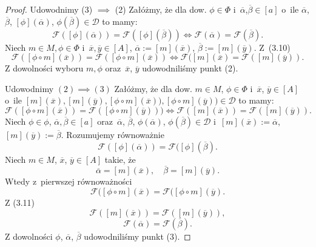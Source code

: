 \documentclass[12pt,a4paper]{report}
\newcommand{\domkniecie}[1]{\left[ {#1} \right] }
\begin{document}
\begin{proof}
Udowodnimy (3) $\implies$ (2)
Załóżmy, że dla dow. $\phi \in \Phi$ i~$\overline{\alpha}$,$ \overline{\beta} \in \domkniecie{a}$ o~ile $\overline{\alpha}$, $\overline{\beta}$, $\domkniecie{\phi}(\overline{\alpha})$, $\phi(\overline{\beta}) \in \mathcal{D}$ to mamy:
\begin{equation}
\mathcal{F}(\domkniecie{\phi}(\overline{\alpha}))=\mathcal{F}(\domkniecie{\phi}(\overline{\beta})) \iff \mathcal{F}(\overline{\alpha})=\mathcal{F}(\overline{\beta}).
\end{equation}
Niech $m\in M, \phi\in \Phi$ i~$\overline{x}, \overline{y} \in \domkniecie{A}$, $\overline{\alpha}:=\domkniecie{m}(\overline{x})$, $\overline{\beta}:=\domkniecie{m}(\overline{y})$. Z~(3.10)
$$
\mathcal{F}(\domkniecie{\phi\circ m}(\overline{x}))=\mathcal{F}(\domkniecie{\phi\circ m}(\overline{x})) \iff \mathcal{F}(\domkniecie{m} (\overline{x})=\mathcal{F}(\domkniecie{m}(\overline{y})).
$$
Z dowolności wyboru $m, \phi$ oraz~$\overline{x}$, $\overline{y}$ udowodniliśmy punkt (2).

Udowodnimy $(2) \implies (3)$
Załóżmy, że dla dow. $m \in M$, $\phi \in \Phi$ i~$\overline{x}$, $\overline{y} \in \domkniecie{A}$ o~ile $\domkniecie{m}(\overline{x}), \domkniecie{
m}(\overline{y}), \domkniecie{\phi\circ m}(\overline{x})), \domkniecie{\phi\circ m}(\overline{y})) \in \mathcal{D}$ to mamy:
\begin{equation}
\mathcal{F}(\domkniecie{\phi \circ m}(\overline{x}))=\mathcal{F}(\domkniecie{\phi \circ m}(\overline{y}))) \iff \mathcal{F}(\domkniecie{m}(\overline{x}))=\mathcal{F}(\domkniecie{m}(\overline{y})).
\end{equation}
Niech $\phi \in \phi$, $\overline{\alpha}, \overline{\beta} \in \domkniecie{a}$ oraz~$\overline{\alpha}$, $\overline{\beta}$, $\phi(\overline{\alpha})$, $\phi(\overline{\beta}) \in \mathcal{D}$ i~$\domkniecie{m}(\overline{x}):=\overline{\alpha}$,  $\domkniecie{m}(\overline{y}):=\overline{\beta}$. 
Rozumujemy równoważnie
$$
\mathcal{F}(\domkniecie{\phi}(\overline{\alpha}))=\mathcal{F}(\domkniecie{\phi}(\overline{\beta}).
$$
Niech $m \in M$, $\overline{x}$, $\overline{y} \in \domkniecie{A}$ takie, że
$$
\overline{\alpha}=\domkniecie{m}(\overline{x}), \quad \overline{\beta}=\domkniecie{m}(\overline{y}).
$$
Wtedy z~pierwszej równoważności
$$
\mathcal{F}(\domkniecie{\phi \circ m}(\overline{x})=\mathcal{F}(\domkniecie{\phi \circ m}(\overline{y}).
$$
Z (3.11)
$$
\mathcal{F}(\domkniecie{m}(\overline{x}))=\mathcal{F}(\domkniecie{m}(\overline{y})), 
$$
$$
\mathcal{F}(\overline{\alpha})=\mathcal{F}(\overline{\beta}).
$$
Z dowolności $\phi$, $\overline{\alpha}$, $\overline{\beta}$ udowodniliśmy punkt (3).
\end{proof}
\end{document}

